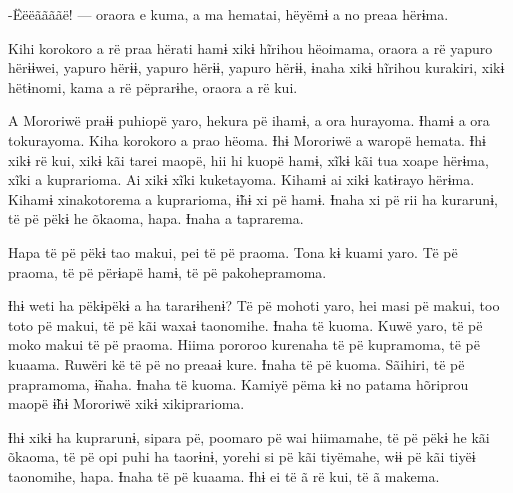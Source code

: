 -Ëëëããããë! --- oraora e kuma, a ma hematai, hëyëmɨ a no preaa hërɨma. 

Kihi korokoro a rë praa hërati hamɨ xikɨ hĩrihou hëoimama, oraora a rë
yapuro hërɨɨwei, yapuro hërɨɨ, yapuro hërɨɨ, yapuro hërɨɨ, ɨnaha xikɨ
hĩrihou kurakiri, xikɨ hëtɨnomi, kama a rë pëprarɨhe, oraora a rë kui. 

A Mororiwë praɨɨ puhiopë yaro, hekura pë ihamɨ, a ora hurayoma. Ɨhamɨ a
ora tokurayoma. Kiha korokoro a prao hëoma. Ɨhɨ Mororiwë a waropë
hemata. Ɨhɨ xikɨ rë kui, xikɨ kãi tarei maopë, hii hi kuopë hamɨ, xĩkɨ
kãi tua xoape hërɨma, xĩki a kuprarioma. Ai xikɨ xĩki kuketayoma. Kihamɨ
ai xikɨ katɨrayo hërɨma. Kihamɨ xinakotorema a kuprarioma, ɨ̃hɨ xi pë
hamɨ. Ɨnaha xi pë rii ha kurarunɨ, të pë pëkɨ he õkaoma, hapa. Ɨnaha a
taprarema. 

Hapa të pë pëkɨ tao makui, pei të pë praoma. Tona kɨ kuami yaro. Të pë
praoma, të pë përɨapë hamɨ, të pë pakohepramoma. 

Ɨhɨ weti ha pëkɨpëkɨ a ha tararɨhenɨ? Të pë mohoti yaro, hei masi pë
makui, too toto pë makui, të pë kãi waxaɨ taonomihe. Ɨnaha të kuoma.
Kuwë yaro, të pë moko makui të pë praoma. Hiima pororoo kurenaha të pë
kupramoma, të pë kuaama. Ruwëri kë të pë no preaaɨ kure. Ɨnaha të pë
kuoma. Sãihiri, të pë prapramoma, ɨ̃naha. Ɨnaha të kuoma. Kamiyë pëma kɨ
no patama hõriprou maopë ɨ̃hɨ Mororiwë xikɨ xikiprarioma. 

Ɨhɨ xikɨ ha kuprarunɨ, sipara pë, poomaro pë wai hiimamahe, të pë pëkɨ
he kãi õkaoma, të pë opi puhi ha taorɨnɨ, yorehi si pë kãi tiyëmahe, wɨɨ
pë kãi tiyëɨ taonomihe, hapa. Ɨnaha të pë kuaama. Ɨhɨ ei të ã rë kui, të
ã makema.

 

 
